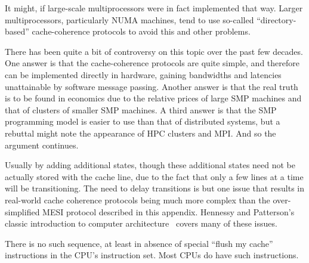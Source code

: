 
	It might, if large-scale multiprocessors were in fact implemented
	that way.  Larger multiprocessors, particularly NUMA machines,
	tend to use so-called ``directory-based'' cache-coherence
	protocols to avoid this and other problems.


	There has been quite a bit of controversy on this topic over
	the past few decades.  One answer is that the cache-coherence
	protocols are quite simple, and therefore can be implemented
	directly in hardware, gaining bandwidths and latencies
	unattainable by software message passing.  Another answer is that
	the real truth is to be found in economics due to the relative
	prices of large SMP machines and that of clusters of smaller
	SMP machines.  A third answer is that the SMP programming
	model is easier to use than that of distributed systems, but
	a rebuttal might note the appearance of HPC clusters and MPI.
	And so the argument continues.


	Usually by adding additional states, though these additional
	states need not be actually stored with the cache line, due to
	the fact that only a few lines at a time will be transitioning.
	The need to delay transitions is but one issue that results in
	real-world cache coherence protocols being much more complex than
	the over-simplified MESI protocol described in this appendix.
	Hennessy and Patterson's classic introduction to computer
	architecture~\cite{Hennessy95a} covers many of these issues.


	There is no such sequence, at least in absence of special
	``flush my cache'' instructions in the CPU's instruction set.
	Most CPUs do have such instructions.


